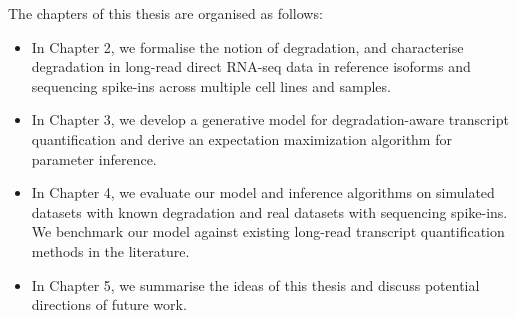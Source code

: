 The chapters of this thesis are organised as follows:
\begin{itemize}
    \item In Chapter 2, we formalise the notion of degradation, and characterise degradation in long-read direct RNA-seq data in reference isoforms and sequencing spike-ins across multiple cell lines and samples. 
    \item In Chapter 3, we develop a generative model for degradation-aware transcript quantification and derive an expectation maximization algorithm for parameter inference. 
    \item In Chapter 4, we evaluate our model and inference algorithms on simulated datasets with known degradation and real datasets with sequencing spike-ins. We benchmark our model against existing long-read transcript quantification methods in the literature. 
    \item In Chapter 5, we summarise the ideas of this thesis and discuss potential directions of future work. 
\end{itemize}